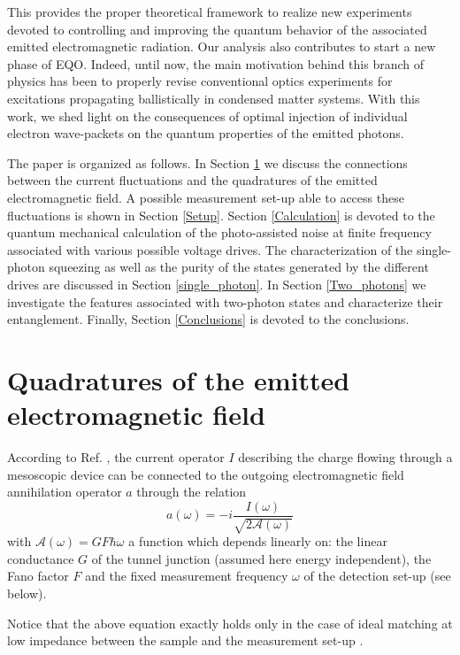 \documentclass[twocolumn,showpacs,preprintnumbers,amsmath,amssymb%
 aps,
 prb,
 lengthcheck,%
]{revtex4-1}
\def\be{\begin{equation}}
\def\ee{\end{equation}}
\begin{document}
This provides the proper theoretical framework to realize new experiments devoted to controlling and improving the quantum behavior of the associated emitted electromagnetic radiation. Our analysis also contributes to start a new phase of EQO. Indeed, until now, the main motivation behind this branch of physics has been to properly revise conventional optics experiments for excitations propagating ballistically in condensed matter systems. With this work, we shed light on the consequences of optimal injection of individual electron wave-packets on the quantum properties of the emitted photons.

The paper is organized as follows. In Section \ref{Quadratures} we discuss the connections between the current fluctuations and the quadratures of the emitted electromagnetic field. A possible measurement set-up able to access these fluctuations is shown in Section \ref{Setup}. Section \ref{Calculation} is devoted to the quantum mechanical calculation of the photo-assisted noise at finite frequency associated with various possible voltage drives. The characterization of the single-photon squeezing as well as the purity of the states generated by the different drives are discussed in Section \ref{single_photon}. In Section \ref{Two_photons} we investigate the features associated with two-photon states and characterize their entanglement. Finally, Section \ref{Conclusions} is devoted to the conclusions. 

\section{Quadratures of the emitted electromagnetic field}\label{Quadratures} According to Ref. , the current operator $I$ describing the charge flowing through a mesoscopic device can be connected to the outgoing electromagnetic field annihilation operator $a$ through the relation 
\be
a(\omega)= -i \frac{I(\omega)}{\sqrt{2 \mathcal{A}(\omega)}}
\ee
with $\mathcal{A}(\omega)=G F \hbar \omega$ a function which depends linearly on: the linear conductance  $G$ of the tunnel junction (assumed here energy independent), the Fano factor $F$ and the fixed measurement frequency $\omega$ of the detection set-up (see below). 

Notice that the above equation exactly holds only in the case of ideal matching at low impedance between the sample and the measurement set-up \cite{grimsmo_quantum_2016}. 
\end{document}
